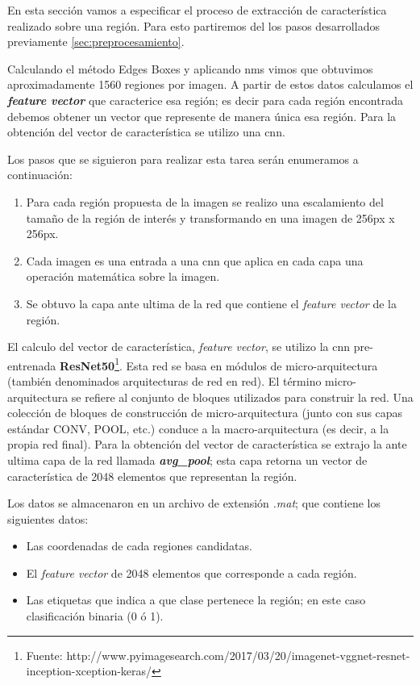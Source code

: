 En esta sección vamos a especificar el proceso de extracción  de característica realizado sobre una región. Para esto partiremos del los pasos desarrollados previamente \ref{sec:preprocesamiento}.

Calculando el método Edges Boxes y aplicando \ac{nms} vimos que obtuvimos aproximadamente 1560 regiones por imagen. A partir de estos datos calculamos el \textbf{\textit{feature vector}} que caracterice esa región; es decir para cada región encontrada debemos obtener un vector que represente de manera única esa región. Para la obtención del vector de característica se utilizo una \ac{cnn}. 

Los pasos que se siguieron para realizar esta tarea serán enumeramos a continuación:

\begin{enumerate}
	\item Para cada región propuesta de la imagen se realizo una escalamiento del tamaño de la región de interés y  transformando en una imagen de 256px x 256px.
	\item Cada imagen es una entrada a una \ac{cnn} que aplica en cada capa una operación matemática sobre la imagen.
	\item Se obtuvo la capa ante ultima de la red que contiene el \textit{feature vector} de la región. 
\end{enumerate}

El calculo del vector de característica, \textit{feature vector}, se utilizo la \ac{cnn} pre-entrenada \textbf{ResNet50}\footnote{Fuente: http://www.pyimagesearch.com/2017/03/20/imagenet-vggnet-resnet-inception-xception-keras/}. Esta red se basa en módulos de micro-arquitectura (también denominados arquitecturas de red en red). El término micro-arquitectura se refiere al conjunto de bloques utilizados para construir la red. Una colección de bloques de construcción de micro-arquitectura (junto con sus capas estándar CONV, POOL, etc.) conduce a la macro-arquitectura (es decir, a la propia red final). Para la obtención del vector de característica se extrajo la ante ultima capa de la red llamada \textit{\textbf{avg\_pool}}; esta capa retorna un vector de característica de 2048 elementos que representan la región.


Los datos se almacenaron en un archivo de extensión \textit{.mat}; que contiene los siguientes datos:
\begin{itemize}
 \item Las coordenadas de cada regiones candidatas.
 \item El \textit{feature vector} de 2048 elementos que corresponde a cada región. 
 \item Las etiquetas que indica a que clase pertenece la región; en este caso clasificación binaria (0 ó 1).
\end{itemize}





